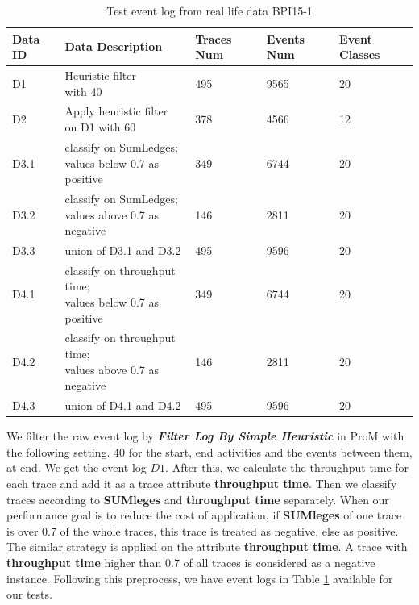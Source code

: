 \begin{table}[h]	
	\caption{Test event log from real life data BPI15-1}
	\label{tab:event-log}
	\begin{tabular}{|l|l|l|l|l|}
		\hline
		Data ID & Data Description                                & Traces Num & Events Num & Event Classes \\ \hline
		D1      & \makecell{Heuristic filter  \\ with 40 }                     & 495        & 9565       & 20             \\ \hline
		D2      & \makecell{Apply heuristic filter \\ on D1 with 60      }     & 378        & 4566       & 12            \\ \hline
		D3.1    & \makecell{classify on SumLedges;  \\ values below 0.7 as positive} & 349        & 6744       & 20             \\ \hline
		D3.2    & \makecell{classify on SumLedges;  \\ values above 0.7 as negative }& 146        & 2811       & 20             \\  \hline
		D3.3    & union of D3.1 and D3.2                             & 495        & 9596       & 20             \\ \hline
		D4.1    & \makecell{ classify on throughput time;  \\ values below 0.7 as positive} & 349        & 6744       & 20             \\ \hline
		D4.2    & \makecell{classify on throughput time;  \\ values above 0.7 as negative} & 146        & 2811       & 20            \\ \hline
		D4.3    & union of D4.1 and D4.2                             & 495        & 9596       & 20           \\ \hline
	\end{tabular}
\end{table}

We filter the raw event log by \textbf{\emph{Filter Log By Simple Heuristic}} in ProM with the following setting. 40 for the start, end  activities and the events between them, at end. We get the event log $D1$. After this, we calculate the throughput time for each trace and add it as a trace attribute \textbf{throughput time}. 
Then we classify traces according to  \textbf{SUMleges} and  \textbf{throughput time} separately. When our performance goal is to reduce the cost of application, if \textbf{SUMleges} of one trace is over 0.7 of the whole traces, this trace is treated as negative, else as positive. The similar strategy is applied on the attribute \textbf{throughput time}. A trace with \textbf{throughput time} higher than 0.7 of all traces is considered as a negative instance. Following this preprocess, we have event logs in Table \ref{tab:event-log} available for our tests. 


